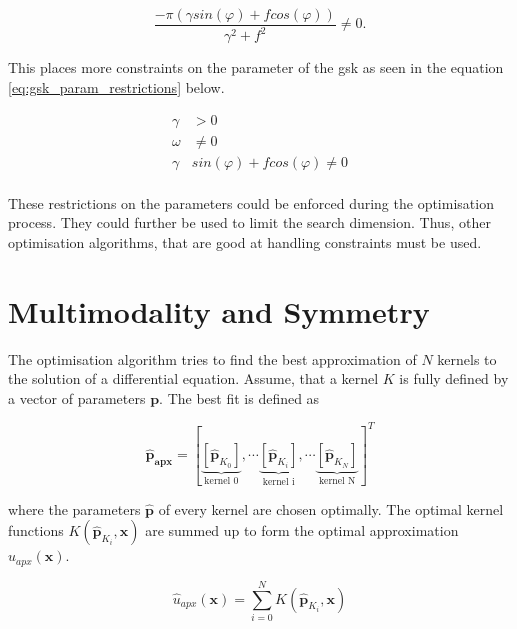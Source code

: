 \documentclass[./\jobname.tex]{subfiles}
\begin{document}
\begin{equation}
	\frac{-\pi (\gamma sin(\varphi) + f cos(\varphi))}{\gamma^2 + f^2} \neq 0.
\end{equation}

This places more constraints on the parameter of the \gls{gsk} as seen in the equation \eqref{eq:gsk_param_restrictions} below. 

\begin{equation}
\label{eq:gsk_param_restrictions}
	\begin{split}
	\gamma & > 0 \\
	\omega & \neq 0 \\
	\gamma & sin(\varphi) + f cos(\varphi) \neq 0 \\
	\end{split}
\end{equation}

These restrictions on the parameters could be enforced during the optimisation process. They could further be used to limit the search dimension. Thus, other optimisation algorithms, that are good at handling constraints must be used. 

\section{Multimodality and Symmetry}
\label{chap:multimodality_and_symmetry}

The optimisation algorithm tries to find the best approximation of $N$ kernels to the solution of a differential equation. Assume, that a kernel $K$ is fully defined by a vector of parameters $\mathbf{p}$. The best fit is defined as 

\begin{equation}
\mathbf{\hat{p}_{apx}} = \left[\underbrace{\left[ \mathbf{\hat{p}}_{K_0} \right] }_{\text{kernel 0}}, \cdots \underbrace{\left[ \mathbf{\hat{p}}_{K_i} \right] }_{\text{kernel i}}, \cdots \underbrace{\left[ \mathbf{\hat{p}}_{K_N} \right]}_{\text{kernel N}} \right]^T
\end{equation}

where the parameters $\mathbf{\hat{p}}$ of every kernel are chosen optimally. The optimal kernel functions $K(\mathbf{\hat{p}}_{K_i}, \mathbf{x})$ are summed up to form the optimal approximation $\hat{u}_{apx}(\mathbf{x})$. 

\begin{equation}
\label{eq:uapx_kernel_sum}
\hat{u}_{apx}(\mathbf{x}) = \sum_{i=0}^{N} K(\mathbf{\hat{p}}_{K_i}, \mathbf{x})
\end{equation}
\end{document}
